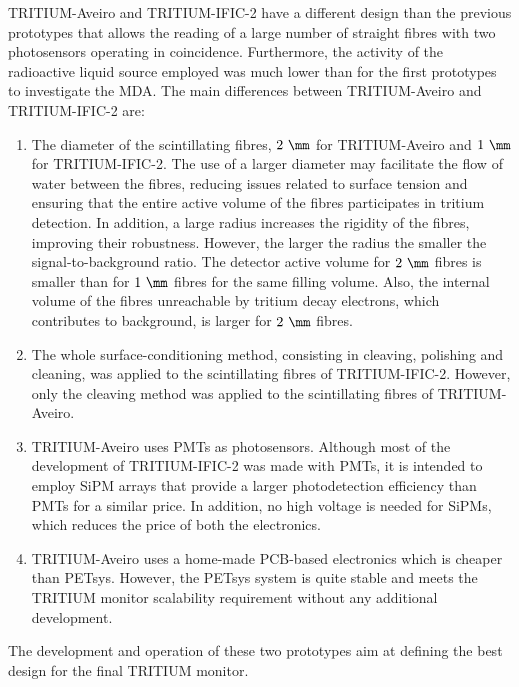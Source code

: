 TRITIUM-Aveiro and TRITIUM-IFIC-2 have a different design than the previous prototypes that allows the reading of a large number of straight fibres with two photosensors operating in coincidence. Furthermore, the activity of the radioactive liquid source employed was much lower than for the first prototypes to investigate the MDA. The main differences between TRITIUM-Aveiro and TRITIUM-IFIC-2 are:

\begin{enumerate}

\item{} The diameter of the scintillating fibres, $2~\mm$ for TRITIUM-Aveiro and $1~\mm$ for TRITIUM-IFIC-2. The use of a larger diameter may facilitate the flow of water between the fibres, reducing issues related to surface tension and ensuring that the entire active volume of the fibres participates in tritium detection. In addition, a large radius increases the rigidity of the fibres, improving their robustness. However, the larger the radius the smaller the signal-to-background ratio. The detector active volume for $2~\mm$ fibres is smaller than for $1~\mm$ fibres for the same filling volume. Also, the internal volume of the fibres unreachable by tritium decay electrons, which contributes to background, is larger for $2~\mm$ fibres.


\item{} The whole surface-conditioning method, consisting in cleaving, polishing and cleaning, was applied to the scintillating fibres of TRITIUM-IFIC-2. However, only the cleaving method was applied to the scintillating fibres of TRITIUM-Aveiro.

\item{} TRITIUM-Aveiro uses PMTs as photosensors. Although most of the development of TRITIUM-IFIC-2 was made with PMTs, it is intended to employ SiPM arrays that provide a larger photodetection efficiency than PMTs for a similar price. In addition, no high voltage is needed for SiPMs, which reduces the price of both the electronics.

\item{} TRITIUM-Aveiro uses a home-made PCB-based electronics which is cheaper than PETsys. However, the PETsys system is quite stable and meets the TRITIUM monitor scalability requirement without any additional development.

\end{enumerate}

The development and operation of these two prototypes aim at defining the best design for the final TRITIUM monitor.
